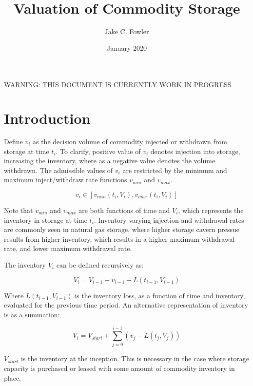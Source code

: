 \documentclass{article}
\title{Valuation of Commodity Storage}
\author{Jake C. Fowler}
\date{January 2020}
\begin{document}
\newcommand{\+}[1]{\ensuremath{\mathbf{#1}}}

\maketitle

WARNING: THIS DOCUMENT IS CURRENTLY WORK IN PROGRESS

\section{Introduction}
Define $v_i$ as the decision volume of commodity injected or withdrawn from storage at time
$t_i$. To clarify, positive value of $v_i$ denotes injection into storage, increasing the
inventory, where as a negative value denotes the volume withdrawn. The admissible values
of $v_i$ are restricted by the minimum and maximum inject/withdraw rate functions
$v_{min}$ and $v_{max}$.

\begin{equation}
    v_i \in [v_{min}(t_i, V_i), v_{max}(t_i, V_i)]
\end{equation}

Note that $v_{min}$ and $v_{max}$ are both functions of time and $V_i$, which represents the
inventory in storage at time $t_i$. Inventory-varying injection and withdrawal rates are commonly
seen in natural gas storage, where higher storage cavern pressue results from higher inventory,
which results in a higher maximum withdrawal rate, and lower maximum withdrawal rate.

\bigskip

The inventory $V_i$ can be defined recursively as:

\begin{equation}
    V_i = V_{i-1} + v_{i-1} - L(t_{i-1}, V_{i-1}) 
\end{equation}

Where $L(t_{i-1}, V_{i-1})$ is the inventory loss, as a function of time and inventory, 
evaluated for the previous time period. An alternative representation of inventory is 
as a summation:

\begin{equation}
    V_i = V_{start} + \sum\limits^{i-1}_{j=0} {(v_{j} - L(t_j, V_j))}
\end{equation}

$V_{start}$ is the inventory at the inception. This is necessary in the case where storage
capacity is purchased or leased with some amount of commodity inventory in place.
\end{document}
